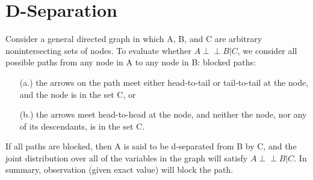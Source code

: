 \documentclass{article}
\def\ci{\perp\!\!\!\perp}
\begin{document}
\section{D-Separation}
Consider a general directed graph in which A, B, and C are arbitrary nonintersecting sets of nodes. To evaluate whether $A \ci B | C$, we consider all possible paths from any node in A to any node in B:
blocked paths:
\begin{itemize}
    \item[(a.)] the arrows on the path meet either head-to-tail or tail-to-tail at the node, and the node is in the set C, or
    \item[(b.)]the arrows meet head-to-head at the node, and neither the node, nor any of its descendants, is in the set C.
\end{itemize}
If all paths are blocked, then A is said to be d-separated from B by C, and the joint distribution over all of the variables in the graph will satisfy $A \ci B | C$.
In summary, observation (given exact value) will block the path.







\appendix
\end{document}
